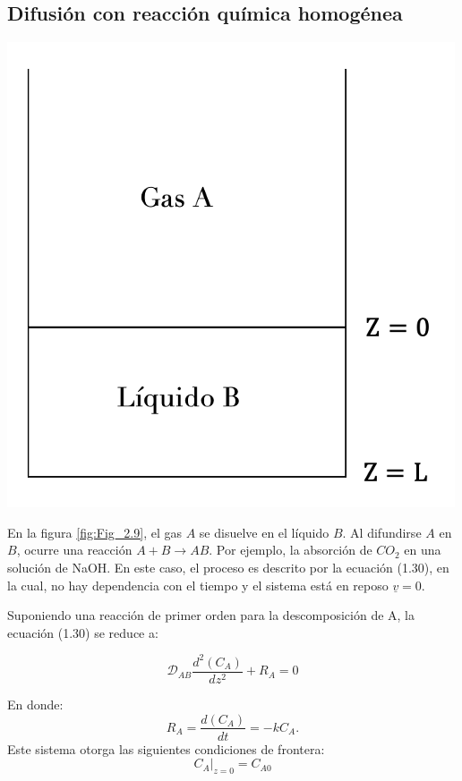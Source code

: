 
\subsection{Difusión con reacción química homogénea}

\begin{minipage}{0.5\textwidth} 
    \centering
    \includegraphics[width=0.8\linewidth]{Capitulo2/Imagenes/Fig_2.9.png} 
    \label{fig:Fig_2.9}
\end{minipage}%
\begin{minipage}{0.4\textwidth} 
    En la figura \ref{fig:Fig_2.9}, el gas \( A \) se disuelve en el líquido \( B \). Al difundirse \( A \) en \( B \), ocurre una reacción \( A + B \xrightarrow{} AB \). Por ejemplo, la absorción de \( CO_2 \) en una solución de NaOH.
        En este caso, el proceso es descrito por la ecuación (1.30), en la cual, no hay dependencia con el tiempo y el sistema está en reposo \( \underline{v} = 0 \).
\end{minipage}
    

\vspace{1 cm}
Suponiendo una reacción de primer orden para la descomposición de A, la ecuación (1.30) se reduce a:

\begin{equation}   
 \mathscr{D}_{AB}\frac{d^2(C_A)}{dz^2}+R_A=0
\end{equation}


En donde:\begin{equation}
    R_A=\frac{d(C_A)}{dt}=-kC_A.   
\end{equation}
Este sistema otorga las siguientes condiciones de frontera:
\begin{equation}
    C_A|_{z=0}=C_{A0}  
\end{equation}

